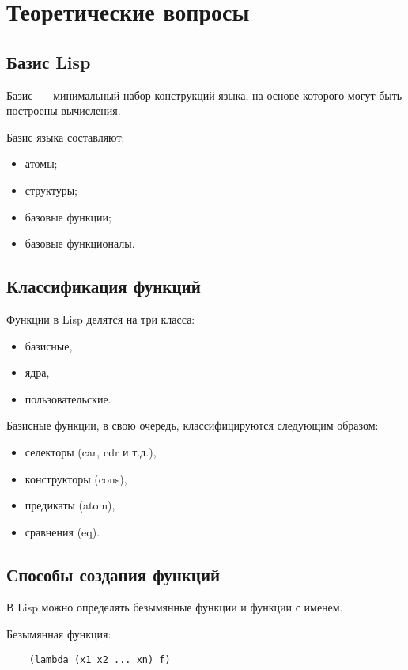 \chapter{Теоретические вопросы}

\section{Базис Lisp}

Базис~--- минимальный набор конструкций языка, на основе которого могут быть построены вычисления.

Базис языка составляют:
\begin{itemize}
	\item атомы;
	\item структуры;
	\item базовые функции;
	\item базовые функционалы.
\end{itemize}

\section{Классификация функций}

Функции в Lisp делятся на три класса:
\begin{itemize}
	\item базисные,
	\item ядра,
	\item пользовательские.
\end{itemize}

Базисные функции, в свою очередь, классифицируются следующим образом:
\begin{itemize}
	\item селекторы (car, cdr и т.д.),
	\item конструкторы (cons),
	\item предикаты (atom),
	\item сравнения (eq).
\end{itemize}

\section{Способы создания функций}

В Lisp можно определять безымянные функции и функции с именем.

Безымянная функция:
\begin{lstlisting}
	(lambda (x1 x2 ... xn) f)
\end{lstlisting}


